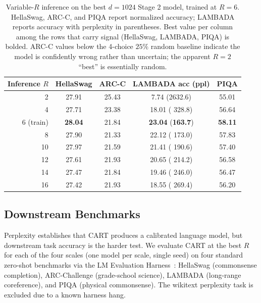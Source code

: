 \documentclass{article}
\newcommand{\cart}{\textsc{CART}}
\begin{document}
\begin{table}[htbp]
\centering
\caption{Variable-$R$ inference on the best $d{=}1024$ Stage 2 model, trained at $R{=}6$. HellaSwag, ARC-C, and PIQA report normalized accuracy; LAMBADA reports accuracy with perplexity in parentheses. Best value per column among the rows that carry signal (HellaSwag, LAMBADA, PIQA) is bolded. ARC-C values below the 4-choice $25\%$ random baseline indicate the model is confidently wrong rather than uncertain; the apparent $R{=}2$ ``best'' is essentially random.}
\label{tab:variable_r}
\footnotesize
\begin{tabular}{rcccc}
\toprule
Inference $R$ & HellaSwag & ARC-C & LAMBADA acc (ppl) & PIQA \\
\midrule
 2         & 27.91 & 25.43 &  7.74 (2632.6) & 55.01 \\
 4         & 27.71 & 23.38 & 18.01 ( 328.8) & 56.64 \\
 6 (train) & \textbf{28.04} & 21.84 & \textbf{23.04} (\textbf{163.7}) & \textbf{58.11} \\
 8         & 27.90 & 21.33 & 22.12 ( 173.0) & 57.83 \\
10         & 27.97 & 21.59 & 21.41 ( 190.6) & 57.40 \\
12         & 27.61 & 21.93 & 20.65 ( 214.2) & 56.58 \\
14         & 27.47 & 21.84 & 19.46 ( 246.0) & 56.47 \\
16         & 27.42 & 21.93 & 18.55 ( 269.4) & 56.20 \\
\bottomrule
\end{tabular}
\end{table}

\subsection{Downstream Benchmarks}
\label{sec:benchmarks}

Perplexity establishes that \cart{} produces a calibrated language model, but downstream task accuracy is the harder test. We evaluate \cart{} at the best $R$ for each of the four scales (one model per scale, single seed) on four standard zero-shot benchmarks via the LM Evaluation Harness~\citep{eval-harness}: HellaSwag (commonsense completion), ARC-Challenge (grade-school science), LAMBADA (long-range coreference), and PIQA (physical commonsense). The wikitext perplexity task is excluded due to a known harness hang.
\end{document}
